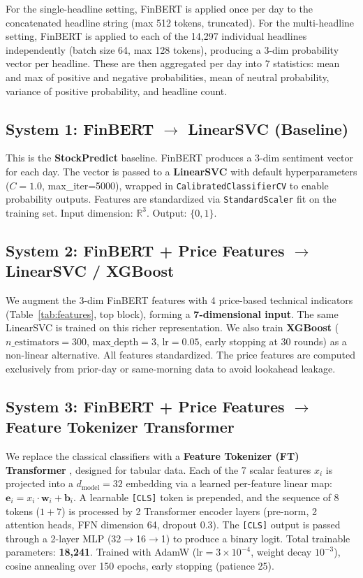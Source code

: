 \documentclass[11pt]{article}
\begin{document}
For the single-headline setting, FinBERT is applied once per day to the concatenated headline string (max 512 tokens, truncated). For the multi-headline setting, FinBERT is applied to each of the 14,297 individual headlines independently (batch size 64, max 128 tokens), producing a 3-dim probability vector per headline. These are then aggregated per day into 7 statistics: mean and max of positive and negative probabilities, mean of neutral probability, variance of positive probability, and headline count.

\subsection{System 1: FinBERT $\to$ LinearSVC (Baseline)}
\label{sec:baseline}

This is the \textbf{StockPredict} baseline. FinBERT produces a 3-dim sentiment vector for each day. The vector is passed to a \textbf{LinearSVC} \citep{cortes1995svm} with default hyperparameters ($C=1.0$, max\_iter=5000), wrapped in \texttt{CalibratedClassifierCV} to enable probability outputs. Features are standardized via \texttt{StandardScaler} fit on the training set. Input dimension: $\mathbb{R}^3$. Output: $\{0, 1\}$.

\subsection{System 2: FinBERT + Price Features $\to$ LinearSVC / XGBoost}

We augment the 3-dim FinBERT features with 4 price-based technical indicators (Table~\ref{tab:features}, top block), forming a \textbf{7-dimensional input}. The same LinearSVC is trained on this richer representation. We also train \textbf{XGBoost} \citep{chen2016xgboost} ($n\_\text{estimators}=300$, $\text{max\_depth}=3$, $\text{lr}=0.05$, early stopping at 30 rounds) as a non-linear alternative. All features standardized. The price features are computed exclusively from prior-day or same-morning data to avoid lookahead leakage.

\subsection{System 3: FinBERT + Price Features $\to$ Feature Tokenizer Transformer}

We replace the classical classifiers with a \textbf{Feature Tokenizer (FT) Transformer} \citep{gorishniy2021revisiting}, designed for tabular data. Each of the 7 scalar features $x_i$ is projected into a $d_{\text{model}}=32$ embedding via a learned per-feature linear map: $\mathbf{e}_i = x_i \cdot \mathbf{w}_i + \mathbf{b}_i$. A learnable \texttt{[CLS]} token is prepended, and the sequence of 8 tokens ($1 + 7$) is processed by 2 Transformer encoder layers (pre-norm, 2 attention heads, FFN dimension 64, dropout 0.3). The \texttt{[CLS]} output is passed through a 2-layer MLP (32$\to$16$\to$1) to produce a binary logit. Total trainable parameters: \textbf{18,241}. Trained with AdamW ($\text{lr}=3\times10^{-4}$, weight decay $10^{-3}$), cosine annealing over 150 epochs, early stopping (patience 25).
\end{document}
